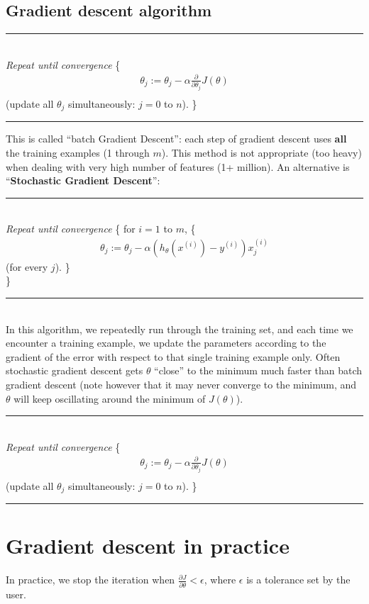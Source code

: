 \documentclass[a4paper,12pt]{report}
\begin{document}
\subsection{Gradient descent algorithm}
\noindent\rule{10cm}{0.4pt} 
\\ \textit{Repeat until convergence} \{
\begin{align*}
\theta_j  := \theta_j - \alpha \frac{\partial}{\partial \theta_j} J(\theta)\\
\end{align*}
(update all $\theta_j$ simultaneously: $j = 0$ to $n$).
\} \\
\noindent\rule{10cm}{0.4pt}

This is called "`batch Gradient Descent"': each step of gradient descent uses \textbf{all} the training examples (1 through $m$). This method is not appropriate (too heavy) when dealing with very high number of features (1+ million). An alternative is "`\textbf{Stochastic Gradient Descent}"':
\noindent\rule{10cm}{0.4pt} 
\\ \textit{Repeat until convergence} \{
for $i=1$ to $m$, \{
\begin{align*}
\theta_j  := \theta_j - \alpha (h_{\theta}(x^{(i)}) - y^{(i)} ) x_j ^{(i)}
\end{align*}
(for every $j$).
\} \\
\} \\
\noindent\rule{10cm}{0.4pt}
\\
In this algorithm, we repeatedly run through the training set, and each time we encounter a training example, we update the parameters according to the gradient of the error with respect to that single training example only. Often stochastic gradient descent gets $\theta$ "`close"' to the minimum much faster than batch gradient descent (note however that it may never converge to the minimum, and $\theta$ will keep oscillating around the minimum of $J(\theta)$).  
\noindent\rule{10cm}{0.4pt} 
\\ \textit{Repeat until convergence} \{
\begin{align*}
\theta_j  := \theta_j - \alpha \frac{\partial}{\partial \theta_j} J(\theta)\\
\end{align*}
(update all $\theta_j$ simultaneously: $j = 0$ to $n$).
\} \\
\noindent\rule{10cm}{0.4pt}

\section{Gradient descent in practice}
In practice, we stop the iteration when $\frac{\partial J}{\partial \theta} < \epsilon$, where $\epsilon$ is a tolerance set by the user.
\end{document}
